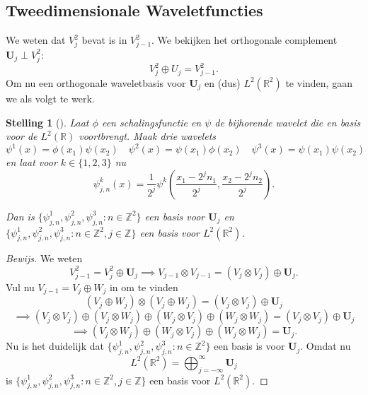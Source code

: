 \documentclass[11pt]{report}
\theoremstyle{plain}
\newtheorem{stelling}{Stelling}
\theoremstyle{definition}
\theoremstyle{remark}
\newcommand{\R}{\mathbb{R}}
\newcommand{\Z}{\mathbb{Z}}
\begin{document}
\subsection{Tweedimensionale Waveletfuncties}
We weten dat $V_j^2$ bevat is in $V_{j-1}^2$. 
We bekijken het orthogonale complement $\boldsymbol{U}_j \perp V_j^2$:
\[
	V_j^2 \oplus U_j = V_{j-1}^2.
\]
Om nu een orthogonale waveletbasis voor $\boldsymbol{U}_j$ en (dus) $L^2(\R^2)$ te vinden, gaan we als volgt te werk.
\begin{stelling}[{\cite[T7.24]{mallat}}]
Laat $\phi$ een schalingsfunctie en $\psi$ de bijhorende wavelet die en basis voor de $L^2(\R)$ voortbrengt. Maak drie wavelets
\[
	\psi^1(x) = \phi(x_1)\psi(x_2) \quad \psi^2(x) = \psi(x_1) \phi(x_2) \quad \psi^3(x) = \psi(x_1)\psi(x_2)
\]
en laat voor $k \in \{1,2,3\}$ nu
\[
	\psi^k_{j,n}(x) = \frac{1}{2^j} \psi^k\left( \frac{x_1 - 2^j n_1}{2^j}, \frac{x_2 - 2^j n_2}{2^j} \right).
\]

Dan is $\{ \psi^1_{j,n}, \psi^2_{j,n}, \psi^3_{j,n}: n \in \Z^2 \}$ een basis voor $\boldsymbol{U}_j$ 
en $\{ \psi^1_{j,n}, \psi^2_{j,n}, \psi^3_{j,n}: n \in \Z^2, j \in \Z \}$ een basis voor $L^2(\R^2)$.
\end{stelling}
\begin{proof}[Bewijs]
We weten
\[
	V_{j-1}^2 = V_j^2 \oplus \boldsymbol{U}_j \implies V_{j-1} \otimes V_{j-1} = ( V_j \otimes V_j ) \oplus \boldsymbol{U}_j.
\]
Vul nu $V_{j-1} = V_j \oplus W_j$ in om te vinden
\[
	( V_j \oplus W_j ) \otimes (V_j \oplus W_j ) = (V_j \otimes V_j) \oplus \boldsymbol{U}_j %
\]
\[
	\implies (V_j \otimes V_j) \oplus (V_j \otimes W_j) \oplus (W_j \otimes V_j) \oplus (W_j \otimes W_j) = (V_j \otimes V_j) \oplus \boldsymbol{U}_j
\]
\[
	\implies (V_j \otimes W_j) \oplus (W_j \otimes V_j) \oplus (W_j \otimes W_j) = \boldsymbol{U}_j.
\]
Nu is het duidelijk dat $\{ \psi^1_{j,n}, \psi^2_{j,n}, \psi^3_{j,n}: n \in \Z^2 \}$ een basis is voor $\boldsymbol{U}_j$. Omdat nu
\[
	L^2(\R^2) = \bigoplus_{j=-\infty}^\infty \boldsymbol{U}_j
\]
is $\{ \psi^1_{j,n}, \psi^2_{j,n}, \psi^3_{j,n}: n \in \Z^2, j \in \Z \}$ een basis voor $L^2(\R^2)$.
\end{proof}
\end{document}
